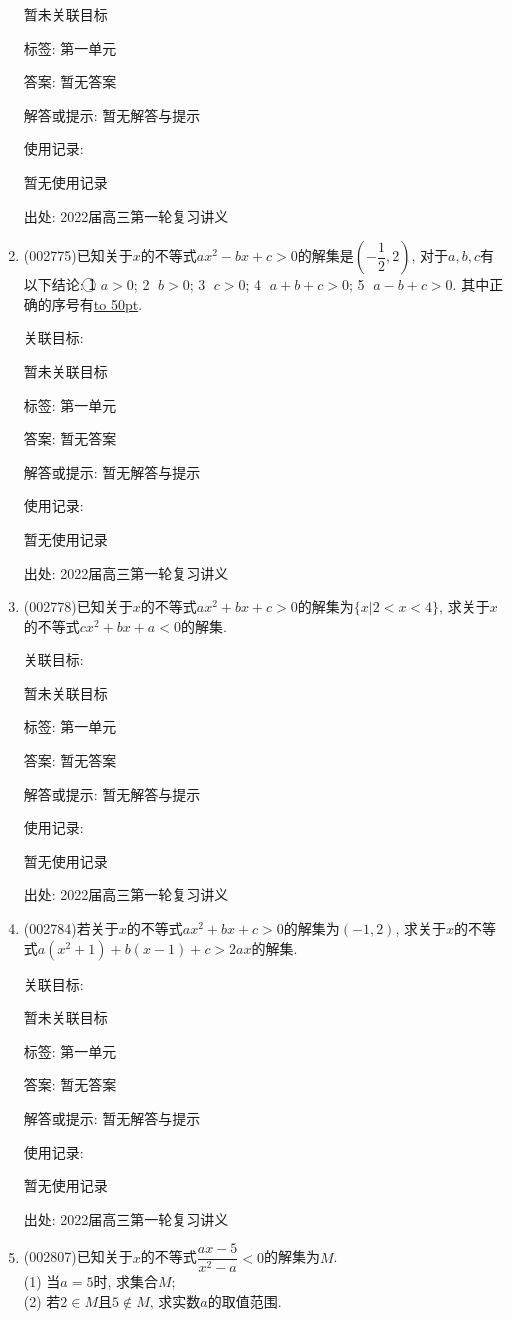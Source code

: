 \documentclass[10pt,a4paper]{article}
\newcommand{\blank}[1]{\underline{\hbox to #1pt{}}}
\begin{document}
\begin{enumerate}[1.]
暂未关联目标



标签: 第一单元

答案: 暂无答案

解答或提示: 暂无解答与提示

使用记录:

暂无使用记录


出处: 2022届高三第一轮复习讲义
\item { (002775)}已知关于$x$的不等式$ax^2-bx+c>0$的解集是$(-\dfrac 12,2)$, 对于$a,b,c$有以下结论: \textcircled{1} $a>0$; \textcircled{2} $b>0$; \textcircled{3} $c>0$; \textcircled{4} $a+b+c>0$; \textcircled{5} $a-b+c>0$. 其中正确的序号有\blank{50}.


关联目标:

暂未关联目标



标签: 第一单元

答案: 暂无答案

解答或提示: 暂无解答与提示

使用记录:

暂无使用记录


出处: 2022届高三第一轮复习讲义
\item { (002778)}已知关于$x$的不等式$ax^2+bx+c>0$的解集为$\{x|2<x<4\}$, 求关于$x$的不等式$cx^2+bx+a<0$的解集.


关联目标:

暂未关联目标



标签: 第一单元

答案: 暂无答案

解答或提示: 暂无解答与提示

使用记录:

暂无使用记录


出处: 2022届高三第一轮复习讲义
\item { (002784)}若关于$x$的不等式$ax^2+bx+c>0$的解集为$(-1,2)$, 求关于$x$的不等式$a(x^2+1)+b(x-1)+c>2ax$的解集.


关联目标:

暂未关联目标



标签: 第一单元

答案: 暂无答案

解答或提示: 暂无解答与提示

使用记录:

暂无使用记录


出处: 2022届高三第一轮复习讲义
\item { (002807)}已知关于$x$的不等式$\dfrac{ax-5}{x^2-a}<0$的解集为$M$.\\
(1) 当$a=5$时, 求集合$M$;\\
(2) 若$2\in M$且$5\notin M$, 求实数$a$的取值范围.



\end{enumerate}
\end{document}
